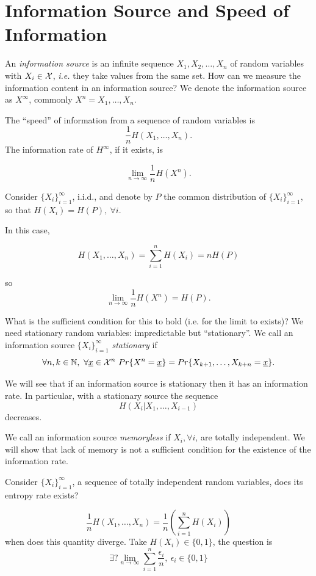\section{Information Source and Speed of Information}

An \emph{information source} is an infinite sequence $X_1, X_2, \ldots, X_n$ of random variables with $X_i \in \mathcal{X}$, \emph{i.e.} they take values from the same set. How can we measure the information content in an information source? We denote the information source as $X^\infty$, commonly $X^n = X_1, \ldots, X_n$. 

The ``speed'' of information from a sequence of random variables is $$\dfrac{1}{n}H(X_1, \ldots, X_n).$$
The information rate of $H^\infty$, if it exists, is

\[
 \lim_{n \rightarrow \infty} \dfrac{1}{n}H(X^n).
\]

Consider $\{X_i\}_{i = 1}^\infty$, i.i.d., and denote by $P$ the common distribution of $\{X_i\}_{i = 1}^\infty$, so that $H(X_i) = H(P),\ \forall i.$

In this case,

\[
 H(X_1, \ldots, X_n) = \sum_{i = 1}^n H(X_i) = nH(P)
\]

so
\[
 \lim_{n \rightarrow \infty} \dfrac{1}{n}H(X^n) = H(P).
\]

What is the sufficient condition for this to hold (i.e. for the limit to exists)? We need stationary random variables: impredictable but ``stationary''. We call an information source $\{X_i\}_{i = 1}^\infty$ \emph{stationary} if 
\[
 \forall n,k \in \mathbb{N},\ \forall \underline{x} \in \mathcal{X}^n\ Pr\{X^n=\underline{x}\} = Pr\{X_{k+1}, \ldots, X_{k+n} = \underline{x}\}.
\]

We will see that if an information source is stationary then it has an information rate. In particular, with a stationary source the sequence $$H(X_i | X_1, \ldots, X_{i-1})$$ decreases.

We call an information source \emph{memoryless} if $X_i, \forall i$, are totally independent. We will show that lack of memory is not a sufficient condition for the existence of the information rate.

Consider $\{X_i\}_{i = 1}^\infty$, a sequence of totally independent random variables, does its entropy rate exists?

\[
 \dfrac{1}{n}H(X_1, \ldots, X_n) = \dfrac{1}{n}\left(\sum_{i=1}^nH(X_i)\right)
\]
when does this quantity diverge. Take $H(X_i) \in \{0, 1\}$, the question is
\[ 
\exists? \lim_{n\rightarrow \infty} \sum_{i = 1}^n \dfrac{\epsilon_i}{n},\ \epsilon_i \in \{0, 1\}
\]


